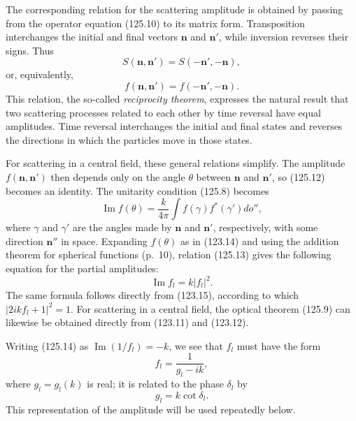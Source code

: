 The corresponding relation for the scattering amplitude is obtained by passing from the operator equation (125.10) to its matrix form. Transposition interchanges the initial and final vectors $\mathbf n$ and $\mathbf n'$, while inversion reverses their signs. Thus
\begin{equation}
 S(\mathbf n,\mathbf n')=S(-\mathbf n',-\mathbf n),
 \tag{125.11}
\end{equation}
or, equivalently,
\begin{equation}
 f(\mathbf n,\mathbf n')=f(-\mathbf n',-\mathbf n).
 \tag{125.12}
\end{equation}
This relation, the so-called \emph{reciprocity theorem}, expresses the natural result that two scattering processes related to each other by time reversal have equal amplitudes. Time reversal interchanges the initial and final states and reverses the directions in which the particles move in those states.

For scattering in a central field, these general relations simplify. The amplitude $f(\mathbf n,\mathbf n')$ then depends only on the angle $\theta$ between $\mathbf n$ and $\mathbf n'$, so (125.12) becomes an identity. The unitarity condition (125.8) becomes
\begin{equation}
 \operatorname{Im}f(\theta)=\frac{k}{4\pi}
 \int f(\gamma)f^*(\gamma')do'',
 \tag{125.13}
\end{equation}
where $\gamma$ and $\gamma'$ are the angles made by $\mathbf n$ and $\mathbf n'$, respectively, with some direction $\mathbf n''$ in space. Expanding $f(\theta)$ as in (123.14) and using the addition theorem for spherical functions (p.~10), relation (125.13) gives the following equation for the partial amplitudes:
\begin{equation}
 \operatorname{Im}f_l=k|f_l|^2.
 \tag{125.14}
\end{equation}
The same formula follows directly from (123.15), according to which $|2ikf_l+1|^2=1$. For scattering in a central field, the optical theorem (125.9) can likewise be obtained directly from (123.11) and (123.12).

Writing (125.14) as $\operatorname{Im}(1/f_l)=-k$, we see that $f_l$ must have the form
\begin{equation}
 f_l=\frac1{g_l-ik},
 \tag{125.15}
\end{equation}
where $g_l=g_l(k)$ is real; it is related to the phase $\delta_l$ by
\begin{equation}
 g_l=k\cot\delta_l.
 \tag{125.16}
\end{equation}
This representation of the amplitude will be used repeatedly below.


